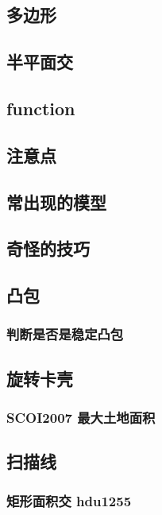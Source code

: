 \documentclass[10pt,a4paper]{article}
\begin{document}
\subsection{多边形}

\subsection{半平面交}

\subsection{function}

\subsection{注意点}

\subsection{常出现的模型}

\subsection{奇怪的技巧}

\subsection{凸包}
\subsubsection{判断是否是稳定凸包}

\subsection{旋转卡壳}
\subsubsection{SCOI2007 最大土地面积}

\subsection{扫描线}
\subsubsection{矩形面积交 hdu1255}

\end{document}
